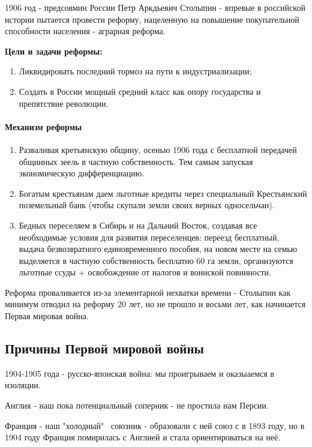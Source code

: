 1906 год - предсовмин России Петр Аркдьевич Столыпин - впревые в российской истории пытается провести реформу, нацеленную на повышение покупательной способности населения - аграрная реформа.

\textbf{Цели и задачи реформы:} 
\begin{enumerate}
	\item Ликвидировать последний тормоз на пути к индустриализации;
	\item Создать в России мощный средний класс как опору государства и препятствие революции.
\end{enumerate}

\paragraph{Механизм реформы}
\begin{enumerate}
	\item Разваливая кретьянскую общину, осенью 1906 года с бесплатной передачей общинных зеель в частную собственность. Тем самым запуская экономическую дифференциацию.
	\item Богатым крестьянам даем льготные кредиты через специальный Крестьянский поземельный банк (чтобы скупали земли своих верных односельчан).
	\item Бедных переселяем в Сибирь и на Дальний Восток, создавая все необходимые условия для развития переселенцев: переезд бесплатный, выдача безвозвратного единовременного пособия, на новом месте на семью выделяется в частную собственность бесплатно 60 га земли, организуются льготные ссуды + освобождение от налогов и воинской повинности.
\end{enumerate}

Реформа проваливается из-за элементарной нехватки времени - Столыпин как минимум отводил на реформу 20 лет, но не прошло и восьми лет, как начинается Первая мировая война.

\subsection{Причины Первой мировой войны}
1904-1905 года - русско-японская война: мы проигрываем и оказыаемся в изоляции.

Англия - наш пока потенциальный соперник - не простила нам Персии.

Франция - наш "холодный" \ союзник - образовали с ней союз с в 1893 году, но в 1904 году Франция помирилась с Англией и стала ориентироваться на неё.

